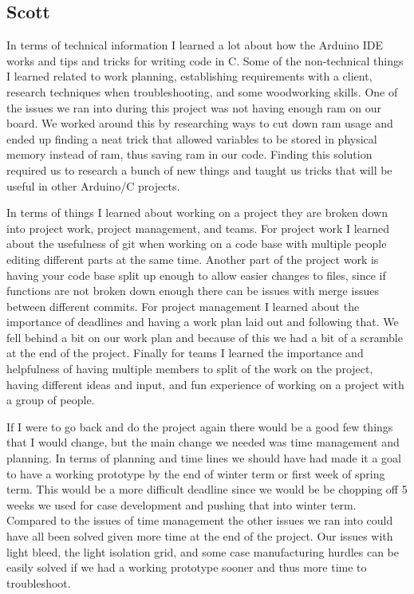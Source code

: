 \documentclass[onecolumn, draftclsnofoot,10pt, compsoc]{IEEEtran}
\begin{document}
\subsection{Scott}
In terms of technical information I learned a lot about how the Arduino IDE works and tips and tricks for writing code in C.
Some of the non-technical things I learned related to work planning, establishing requirements with a client, research techniques when troubleshooting, and some woodworking skills.
One of the issues we ran into during this project was not having enough ram on our board.
We worked around this by researching ways to cut down ram usage and ended up finding a neat trick that allowed variables to be stored in physical memory instead of ram, thus saving ram in our code.
Finding this solution required us to research a bunch of new things and taught us tricks that will be useful in other Arduino/C projects.

In terms of things I learned about working on a project they are broken down into project work, project management, and teams.
For project work I learned about the usefulness of git when working on a code base with multiple people editing different parts at the same time.
Another part of the project work is having your code base split up enough to allow easier changes to files, since if functions are not broken down enough there can be issues with merge issues between different commits.
For project management I learned about the importance of deadlines and having a work plan laid out and following that.
We fell behind a bit on our work plan and because of this we had a bit of a scramble at the end of the project.
Finally for teams I learned the importance and helpfulness of having multiple members to split of the work on the project, having different ideas and input, and fun experience of working on a project with a group of people.

If I were to go back and do the project again there would be a good few things that I would change, but the main change we needed was time management and planning.
In terms of planning and time lines we should have had made it a goal to have a working prototype by the end of winter term or first week of spring term.
This would be a more difficult deadline since we would be be chopping off 5 weeks we used for case development and pushing that into winter term.
Compared to the issues of time management the other issues we ran into could have all been solved given more time at the end of the project.
Our issues with light bleed, the light isolation grid, and some case manufacturing hurdles can be easily solved if we had a working prototype sooner and thus more time to troubleshoot.

\newpage


\end{document}
